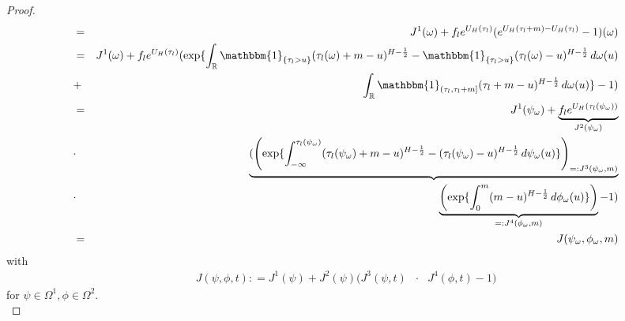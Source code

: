 \documentclass[a4paper, twoside, 11pt]{article}
\theoremstyle{definition}
\newcommand{\brkt}[1]{\left({#1} \right)}
\begin{document}
\begin{proof}
\begin{eqnarray*}
  &=& J^1(\omega) + f_l e^{U_H(\tau_l)}(e^{U_H(\tau_l+m) - U_H(\tau_l)} - 1) (\omega)\\
	&=& J^1(\omega) + f_l e^{U_H(\tau_l)} (\exp\{\int_{\mathbb{R}}\mathbbm{1}_{\{\tau_l> u\}}(\tau_l(\omega)+m-u)^{H-\frac{1}{2}}-\mathbbm{1}_{\{\tau_l> u\}}(\tau_l(\omega)-u)^{H-\frac{1}{2}}\mathop{d\omega(u)}\\
  &+& \int_{\mathbb{R}} \mathbbm{1}_{(\tau_l, \tau_l+m]}(\tau_l+m - u)^{H-\frac{1}{2}}\mathop{d\omega(u)}\}-1)\\
  &=&  J^1(\psi_{\omega}) + \underbrace{f_le^{U_H(\tau_l(\psi_{\omega}))}}_{J^2(\psi_{\omega})}\\
  &\cdot& \underbrace{(\brkt{\exp\{\int_{-\infty}^{\tau_l(\psi_{\omega})}(\tau_l(\psi_{\omega})+m-u)^{H-\frac{1}{2}}-(\tau_l(\psi_{\omega})-u)^{H-\frac{1}{2}}\mathop{d\psi_{\omega}(u)}\}}_{=:J^3(\psi_{\omega}, m)}}\\
  &\cdot&  \underbrace{\brkt{\exp\{\int_0^{m}(m-u)^{H-\frac{1}{2}}\mathop{d \phi_{\omega}(u)}\} }}_{=:J^4(\phi_{\omega}, m)} -1)\\
	&=& J(\psi_{\omega}, \phi_{\omega}, m)
  \end{eqnarray*}
  with
  \begin{eqnarray*}
	J(\psi, \phi, t) : = J^1(\psi) + J^2(\psi) ( J^3(\psi, t)  &\cdot&  J^4(\phi, t) - 1)
  \end{eqnarray*}
  for $\psi\in\Omega^1, \phi\in\Omega^2$.\\


\end{proof}
\end{document}
